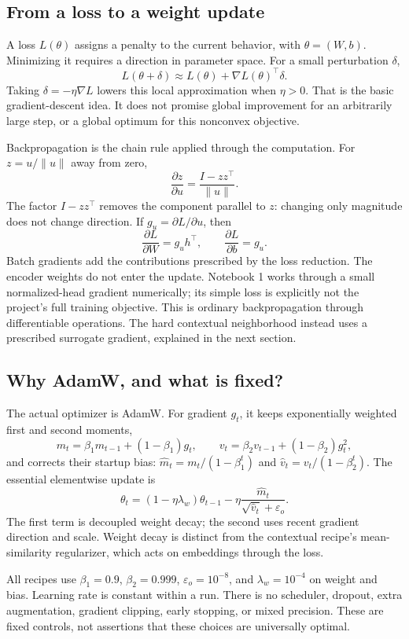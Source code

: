 \subsection{From a loss to a weight update}
A loss $L(\theta)$ assigns a penalty to the current behavior, with
$\theta=(W,b)$. Minimizing it requires a direction in parameter space.
For a small perturbation $\delta$,
\[
 L(\theta+\delta)\approx L(\theta)+\nabla L(\theta)^\top\delta.
\]
Taking $\delta=-\eta\nabla L$ lowers this local approximation when $\eta>0$.
That is the basic gradient-descent idea. It does not promise global improvement
for an arbitrarily large step, or a global optimum for this nonconvex objective.

Backpropagation is the chain rule applied through the computation. For
$z=u/\lVert u\rVert$ away from zero,
\[
 \frac{\partial z}{\partial u}
 =\frac{I-zz^\top}{\lVert u\rVert}.
\]
The factor $I-zz^\top$ removes the component parallel to $z$: changing only
magnitude does not change direction. If $g_u=\partial L/\partial u$, then
\[
 \frac{\partial L}{\partial W}=g_u h^\top,
 \qquad \frac{\partial L}{\partial b}=g_u.
\]
Batch gradients add the contributions prescribed by the loss reduction. The
encoder weights do not enter the update. Notebook 1 works through a small
normalized-head gradient numerically; its simple loss is explicitly not the
project's full training objective. This is ordinary backpropagation through
differentiable operations. The hard contextual neighborhood instead uses a
prescribed surrogate gradient, explained in the next section.

\subsection{Why AdamW, and what is fixed?}
The actual optimizer is AdamW. For gradient $g_t$, it keeps exponentially weighted
first and second moments,
\[
 m_t=\beta_1m_{t-1}+(1-\beta_1)g_t,\qquad
 v_t=\beta_2v_{t-1}+(1-\beta_2)g_t^2,
\]
and corrects their startup bias: $\widehat m_t=m_t/(1-\beta_1^t)$ and
$\widehat v_t=v_t/(1-\beta_2^t)$. The essential elementwise update is
\[
 \theta_t=(1-\eta\lambda_w)\theta_{t-1}
       -\eta\frac{\widehat m_t}{\sqrt{\widehat v_t}+\varepsilon_o}.
\]
The first term is decoupled weight decay; the second uses recent gradient
direction and scale. Weight decay is distinct from the contextual recipe's
mean-similarity regularizer, which acts on embeddings through the loss.

All recipes use $\beta_1=0.9$, $\beta_2=0.999$, $\varepsilon_o=10^{-8}$,
and $\lambda_w=10^{-4}$ on weight and bias. Learning rate is constant within
a run. There is no scheduler, dropout, extra augmentation, gradient clipping,
early stopping, or mixed precision. These are fixed controls, not assertions
that these choices are universally optimal.

